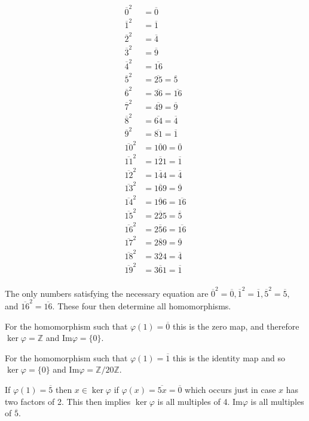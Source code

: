 \documentclass[11pt]{article}
\begin{document}
\begin{enumerate}
\begin{align*}
	\overline 0^2 &= \overline 0 \\
	\overline 1^2 &= \overline 1 \\
	\overline 2^2 &= \overline 4 \\
	\overline 3^2 &= \overline 9 \\
	\overline 4^2 &= \overline{16} \\
	\overline 5^2 &= \overline{25} = \overline{5} \\
	\overline 6^2 &= \overline{36} = \overline{16} \\
	\overline 7^2 &= \overline{49} = \overline{9} \\
	\overline 8^2 &= \overline{64} = \overline{4} \\
	\overline 9^2 &= \overline{81} = \overline{1} \\
	\overline{10}^2 &= \overline{100} = \overline{0} \\
	\overline{11}^2 &= \overline{121} = \overline{1} \\
	\overline{12}^2 &= \overline{144} = \overline{4} \\
	\overline{13}^2 &= \overline{169} = \overline{9} \\
	\overline{14}^2 &= \overline{196} = \overline{16} \\
	\overline{15}^2 &= \overline{225} = \overline{5} \\
	\overline{16}^2 &= \overline{256} = \overline{16} \\
	\overline{17}^2 &= \overline{289} = \overline{9} \\
	\overline{18}^2 &= \overline{324} = \overline{4} \\
	\overline{19}^2 &= \overline{361} = \overline{1} \\
\end{align*}

The only numbers satisfying the necessary equation are $\overline 0^2=\overline 0, \overline 1^2=\overline 1,\overline 5^2 = \overline 5,$ and $\overline {16}^2=\overline{16}$.  These four then determine all homomorphisms.

For the homomorphism such that $\varphi(1)=\overline 0$ this is the zero map, and therefore $\ker\varphi = \mathbb Z$ and $\text{Im}\varphi = \{0\}$.

For the homomorphism such that $\varphi(1)=\overline 1$ this is the identity map and so $\ker\varphi = \{0\}$ and $\text{Im}\varphi = \mathbb Z/20\mathbb Z$.

If $\varphi(1)=\overline 5$ then $x\in\ker\varphi$ if $\varphi(x)=\overline{5x}=\overline{0}$ which occurs just in case $x$ has two factors of 2.  This then implies $\ker\varphi$ is all multiples of 4.  $\text{Im}\varphi$ is all multiples of $\overline 5$.


\end{enumerate}
\end{document}
